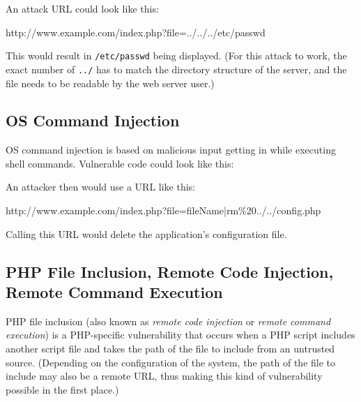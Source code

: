 
An attack URL could look like this:

\begin{textcode}
http://www.example.com/index.php?file=../../../etc/passwd
\end{textcode}


This would result in \texttt{/etc/passwd} being displayed. (For this attack to work, the exact number of \texttt{../} has to match the directory structure of the server, and the file needs to be readable by the web server user.)


\subsection{OS Command Injection}
\label{os-command-injection}
OS command injection is based on malicious input getting in while executing shell commands. Vulnerable code could look like this:


An attacker then would use a URL like this:

\begin{textcode}
http://www.example.com/index.php?file=fileName|rm\%20../../config.php
\end{textcode}

Calling this URL would delete the application's configuration file.


\subsection{PHP File Inclusion, Remote Code Injection, Remote Command Execution}
\label{remote-command-injection}
PHP file inclusion (also known as \emph{remote code injection} or \emph{remote command execution}) is a PHP-specific vulnerability that occurs when a PHP script includes another script file and takes the path of the file to include from an untrusted source. (Depending on the configuration of the system, the path of the file to include may also be a remote URL, thus making this kind of vulnerability possible in the first place.)

